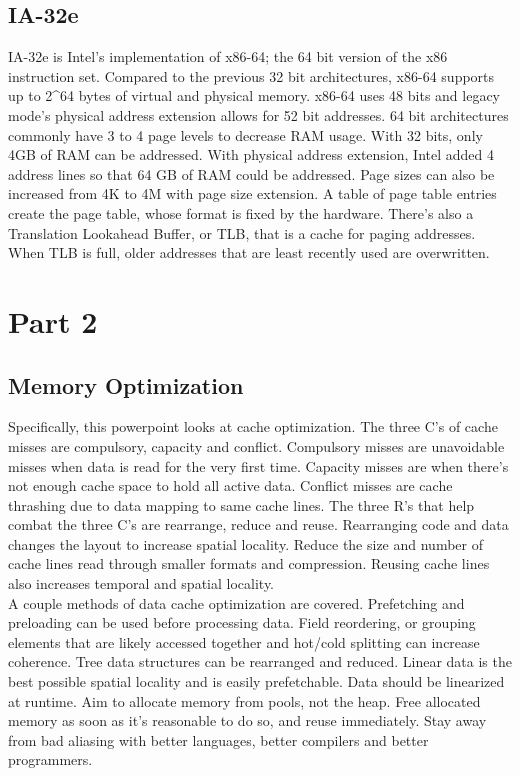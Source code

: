 \documentclass[letterpaper,10pt,titlepage]{article}
\begin{document}
\subsection*{IA-32e}
IA-32e is Intel's implementation of x86-64; the 64 bit version of the x86 instruction set. Compared to the previous 32 bit architectures, x86-64 supports up to 2\^{}64 bytes of virtual and physical memory. x86-64 uses 48 bits and legacy mode's physical address extension allows for 52 bit addresses. 64 bit architectures commonly have 3 to 4 page levels to decrease RAM usage. With 32 bits, only 4GB of RAM can be addressed. With physical address extension, Intel added 4 address lines so that 64 GB of RAM could be addressed. Page sizes can also be increased from 4K to 4M with page size extension. A table of page table entries create the page table, whose format is fixed by the hardware. There's also a Translation Lookahead Buffer, or TLB, that is a cache for paging addresses. When TLB is full, older addresses that are least recently used are overwritten.\cite{ia32e}

\pagebreak

\section*{Part 2}
\subsection*{Memory Optimization}
Specifically, this powerpoint looks at cache optimization. The three C's of cache misses are compulsory, capacity and conflict. Compulsory misses are unavoidable misses when data is read for the very first time. Capacity misses are when there's not enough cache space to hold all active data. Conflict misses are cache thrashing due to data mapping to same cache lines. The three R's that help combat the three C's are rearrange, reduce and reuse. Rearranging code and data changes the layout to increase spatial locality. Reduce the size and number of cache lines read through smaller formats and compression. Reusing cache lines also increases temporal and spatial locality. \\

\noindent A couple methods of data cache optimization are covered. Prefetching and preloading can be used before processing data. Field reordering, or grouping elements that are likely accessed together and hot/cold splitting can increase coherence. Tree data structures can be rearranged and reduced. Linear data is the best possible spatial locality and is easily prefetchable. Data should be linearized at runtime. Aim to allocate memory from pools, not the heap. Free allocated memory as soon as it's reasonable to do so, and reuse immediately. Stay away from bad aliasing with better languages, better compilers and better programmers. \\
\end{document}
